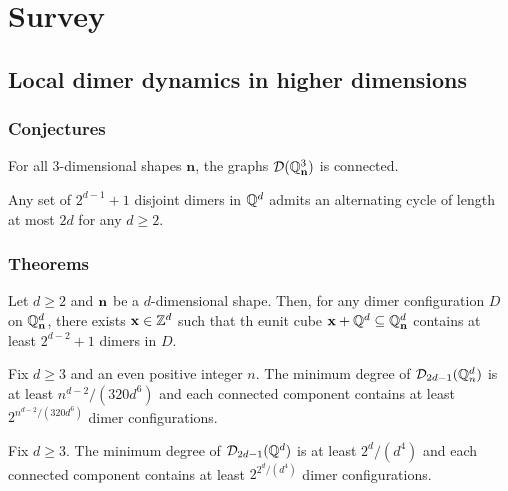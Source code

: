 \chapter{Survey}

\section{Local dimer dynamics in higher dimensions \cite{hartarsky2023local}}

\subsection{Conjectures}

\begin{conjecture}\label{conj-dynamics-1}
	For all $3$-dimensional shapes $\mathbf{n}$, the graphs $\mathcal{D}(\mathbb{Q}_\mathbf{n}^3)$ is connected.
\end{conjecture}

\begin{conjecture}\label{conj-dynamics-2}
	Any set of $2^{d - 1} + 1$ disjoint dimers in $\mathbb{Q}^d$ admits an alternating cycle of length at most $2d$ for any $d \geq 2$.
\end{conjecture}

\subsection{Theorems}
\begin{theorem}\label{thm-dynamics-3}
	Let $d \geq 2$ and $\mathbf{n}$ be a $d$-dimensional shape. Then, for any dimer configuration $D$ on $\mathbb{Q}_{\mathbf{n}}^d$, there exists $\mathbf{x} \in \mathbb{Z}^d$ such that th eunit cube $\mathbf{x} + \mathbb{Q}^d \subseteq \mathbb{Q}_{\mathbf{n}}^d$ contains at least $2^{d - 2} + 1$ dimers in $D$.
\end{theorem}

\begin{theorem}\label{thm-dynamics-4}
	Fix $d \geq 3$ and an even positive integer $n$. The minimum degree of $\mathcal{D}_{2d - 1}(\mathbb{Q}^d_n)$ is at least $n^{d - 2}/(320d^6)$ and each connected component contains at least $2^{n^{d - 2}/(320d^6)}$ dimer configurations.
\end{theorem}

\begin{theorem}\label{thm-dynamics-5}
	Fix $d \geq 3$. The minimum degree of $\mathcal{D}_{2d - 1}(\mathbb{Q}^d)$ is at least $2^d/(d^4)$ and each connected component contains at least $2^{2^d/(d^4)}$ dimer configurations.
\end{theorem}

